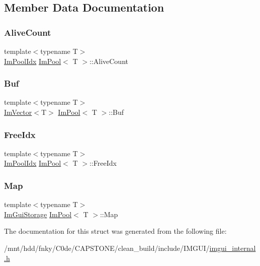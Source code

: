 \subsection{Member Data Documentation}
\mbox{\label{structImPool_aa4a1075102fbc90875cc6144b3961e49}} 
\subsubsection{\texorpdfstring{Alive\+Count}{AliveCount}}
{\footnotesize\ttfamily template$<$typename T$>$ \\
\hyperlink{imgui__internal_8h_a2bcd38f7be434db57a9757ebf7aa56d0}{Im\+Pool\+Idx} \hyperlink{structImPool}{Im\+Pool}$<$ T $>$\+::Alive\+Count}

\mbox{\label{structImPool_ab9368393a8b95f903d77bd49beb84a18}} 
\subsubsection{\texorpdfstring{Buf}{Buf}}
{\footnotesize\ttfamily template$<$typename T$>$ \\
\hyperlink{structImVector}{Im\+Vector}$<$T$>$ \hyperlink{structImPool}{Im\+Pool}$<$ T $>$\+::Buf}

\mbox{\label{structImPool_afe057c62cef34c6425dd56a8a396c118}} 
\subsubsection{\texorpdfstring{Free\+Idx}{FreeIdx}}
{\footnotesize\ttfamily template$<$typename T$>$ \\
\hyperlink{imgui__internal_8h_a2bcd38f7be434db57a9757ebf7aa56d0}{Im\+Pool\+Idx} \hyperlink{structImPool}{Im\+Pool}$<$ T $>$\+::Free\+Idx}

\mbox{\label{structImPool_a6d3b4c9267ef5f496abb97871f9820eb}} 
\subsubsection{\texorpdfstring{Map}{Map}}
{\footnotesize\ttfamily template$<$typename T$>$ \\
\hyperlink{structImGuiStorage}{Im\+Gui\+Storage} \hyperlink{structImPool}{Im\+Pool}$<$ T $>$\+::Map}



The documentation for this struct was generated from the following file\+:\begin{DoxyCompactItemize}
\item 
/mnt/hdd/fnky/\+C0de/\+C\+A\+P\+S\+T\+O\+N\+E/clean\+\_\+build/include/\+I\+M\+G\+U\+I/\hyperlink{imgui__internal_8h}{imgui\+\_\+internal.\+h}\end{DoxyCompactItemize}

